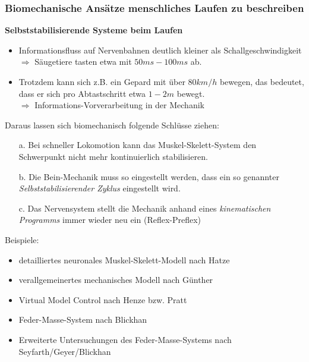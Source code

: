 \subsubsection{Biomechanische Ansätze menschliches Laufen zu beschreiben}
\textbf{Selbststabilisierende Systeme beim Laufen}
\begin{itemize}
\item Informationsfluss auf Nervenbahnen deutlich kleiner als Schallgeschwindigkeit\\
$\Rightarrow$ Säugetiere tasten etwa mit $50ms - 100ms$ ab.
\item Trotzdem kann sich z.B. ein Gepard mit über $80 km/h$ bewegen,
das bedeutet, dass er sich pro \glqq Abtastschritt\grqq{} etwa $1-2 m$ bewegt.\\
$\Rightarrow$ Informations-Vorverarbeitung in der \glqq Mechanik\grqq{}
\end{itemize}
Daraus lassen sich biomechanisch folgende Schlüsse ziehen:
\begin{itemize}
\item[a.] Bei schneller Lokomotion kann das Muskel-Skelett-System den Schwerpunkt nicht mehr kontinuierlich stabilisieren.
\item[b.] Die \glqq Bein-Mechanik\grqq{} muss so eingestellt werden, dass ein so genannter \textit{Selbststabilisierender Zyklus} eingestellt wird.
\item[c.] Das Nervensystem stellt die \glqq Mechanik\grqq{} anhand eines \textit{kinematischen Programms} immer wieder neu ein (Reflex-Preflex)
\end{itemize}
Beispiele:
\begin{itemize}
\item detailliertes neuronales Muskel-Skelett-Modell nach Hatze
\item verallgemeinertes mechanisches Modell nach Günther
\item \glqq Virtual Model Control\grqq{} nach Henze bzw. Pratt
\item Feder-Masse-System nach Blickhan
\item Erweiterte Untersuchungen des Feder-Masse-Systems nach Seyfarth/Geyer/Blickhan
\end{itemize}


